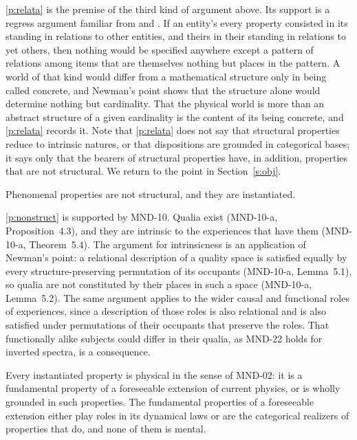 \documentclass{situationist-preprint}
\begin{document}
\ref{p:relata} is the premise of the third kind of argument above. Its support is a regress argument familiar from \citet{Russell1927} and \citet{Blackburn1990}. If an entity's every property consisted in its standing in relations to other entities, and theirs in their standing in relations to yet others, then nothing would be specified anywhere except a pattern of relations among items that are themselves nothing but places in the pattern. A world of that kind would differ from a mathematical structure only in being called concrete, and Newman's point shows that the structure alone would determine nothing but cardinality. That the physical world is more than an abstract structure of a given cardinality is the content of its being concrete, and \ref{p:relata} records it. Note that \ref{p:relata} does not say that structural properties reduce to intrinsic natures, or that dispositions are grounded in categorical bases; it says only that the bearers of structural properties have, in addition, properties that are not structural. We return to the point in Section~\ref{s:obj}.

\begin{principle}\label{p:nonstruct}
Phenomenal properties are not structural, and they are instantiated.
\end{principle}

\ref{p:nonstruct} is supported by MND-10. Qualia exist (MND-10-a, Proposition~4.3), and they are intrinsic to the experiences that have them (MND-10-a, Theorem~5.4). The argument for intrinsicness is an application of Newman's point: a relational description of a quality space is satisfied equally by every structure-preserving permutation of its occupants (MND-10-a, Lemma~5.1), so qualia are not constituted by their places in such a space (MND-10-a, Lemma~5.2). The same argument applies to the wider causal and functional roles of experiences, since a description of those roles is also relational and is also satisfied under permutations of their occupants that preserve the roles. That functionally alike subjects could differ in their qualia, as MND-22 holds for inverted spectra, is a consequence.

\begin{assumption}[Physicalism]\label{a:phys}
Every instantiated property is physical in the sense of MND-02: it is a fundamental property of a foreseeable extension of current physics, or is wholly grounded in such properties. The fundamental properties of a foreseeable extension either play roles in its dynamical laws or are the categorical realizers of properties that do, and none of them is mental.
\end{assumption}
\end{document}
